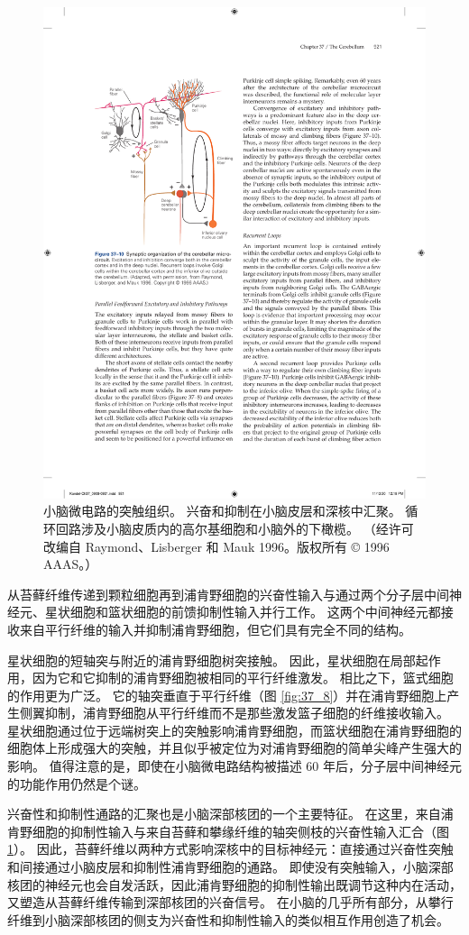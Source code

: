 \begin{figure}[htbp]
	\centering
	\includegraphics[width=0.5\linewidth]{chap37/fig_37_10}
	\caption{小脑微电路的突触组织。 兴奋和抑制在小脑皮层和深核中汇聚。 循环回路涉及小脑皮质内的高尔基细胞和小脑外的下橄榄。 （经许可改编自 Raymond、Lisberger 和 Mauk 1996。版权所有 © 1996 AAAS。）}
	\label{fig:37_10}
\end{figure}

从苔藓纤维传递到颗粒细胞再到浦肯野细胞的兴奋性输入与通过两个分子层中间神经元、星状细胞和篮状细胞的前馈抑制性输入并行工作。 这两个中间神经元都接收来自平行纤维的输入并抑制浦肯野细胞，但它们具有完全不同的结构。

星状细胞的短轴突与附近的浦肯野细胞树突接触。 因此，星状细胞在局部起作用，因为它和它抑制的浦肯野细胞被相同的平行纤维激发。 相比之下，篮式细胞的作用更为广泛。 它的轴突垂直于平行纤维（图 \ref{fig:37_8}）并在浦肯野细胞上产生侧翼抑制，浦肯野细胞从平行纤维而不是那些激发篮子细胞的纤维接收输入。 星状细胞通过位于远端树突上的突触影响浦肯野细胞，而篮状细胞在浦肯野细胞的细胞体上形成强大的突触，并且似乎被定位为对浦肯野细胞的简单尖峰产生强大的影响。 值得注意的是，即使在小脑微电路结构被描述 60 年后，分子层中间神经元的功能作用仍然是个谜。

兴奋性和抑制性通路的汇聚也是小脑深部核团的一个主要特征。 在这里，来自浦肯野细胞的抑制性输入与来自苔藓和攀缘纤维的轴突侧枝的兴奋性输入汇合（图 \ref{fig:37_10}）。 因此，苔藓纤维以两种方式影响深核中的目标神经元：直接通过兴奋性突触和间接通过小脑皮层和抑制性浦肯野细胞的通路。 即使没有突触输入，小脑深部核团的神经元也会自发活跃，因此浦肯野细胞的抑制性输出既调节这种内在活动，又塑造从苔藓纤维传输到深部核团的兴奋信号。 在小脑的几乎所有部分，从攀行纤维到小脑深部核团的侧支为兴奋性和抑制性输入的类似相互作用创造了机会。

